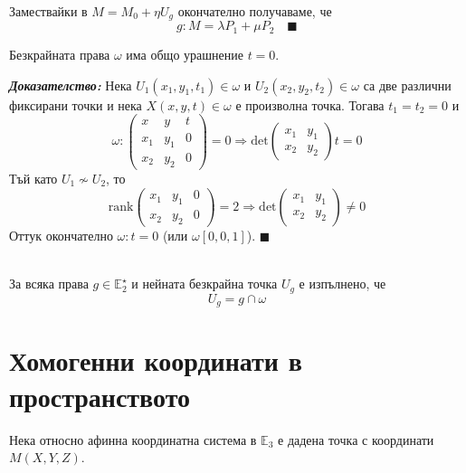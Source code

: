 \documentclass[12pt]{article}
\begin{document}
{Замествайки в $M=M_0+\eta U_g$ окончателно получаваме, че $$g:M=\lambda P_1+\mu P_2\quad \blacksquare$$
\begin{tcolorbox}[
    colback=blue!5,    %
    colframe=blue!75!black, %
    title={\textbf{Твърдение 3:}}, %
    fonttitle=\bfseries,
    boxrule=0.8pt,
    arc=1mm,           %
    top=2mm, bottom=2mm, left=3mm, right=3mm
]  Безкрайната права $\omega$ има общо урашнение $t=0$.
\end{tcolorbox}
\textit{\textbf{Доказателство:}} Нека $U_1(x_1,y_1,t_1)\in\omega$ и $U_2(x_2,y_2,t_2)\in\omega$ са две различни фиксирани точки и нека $X(x,y,t)\in\omega$ е произволна точка. Тогава $t_1=t_2=0$ и $$\omega:\begin{pmatrix}x & y & t \\ x_1 & y_1 & 0 \\ x_2 & y_2 & 0 \end{pmatrix}=0\Rightarrow \mathrm{det}\begin{pmatrix}x_1 & y_1 \\ x_2 & y_2\end{pmatrix}t=0$$
Тъй като $U_1\not\sim U_2$, то $$\mathrm{rank}\begin{pmatrix}x_1 & y_1 & 0 \\ x_2 & y_2 & 0\end{pmatrix}=2\Rightarrow\mathrm{det}\begin{pmatrix}x_1 & y_1 \\ x_2 & y_2\end{pmatrix}\neq 0$$ Оттук окончателно $\omega:t=0$ (или $\omega[0,0,1]$). $\blacksquare$
\\
\\
\begin{tcolorbox}[
    colback=blue!5,    %
    colframe=blue!75!black, %
    title={\textbf{Твърдение 4:}}, %
    fonttitle=\bfseries,
    boxrule=0.8pt,
    arc=1mm,           %
    top=2mm, bottom=2mm, left=3mm, right=3mm
]  За всяка права $g\in\mathbb{E}_2^\star$ и нейната безкрайна точка $U_g$ е изпълнено, че $$U_g=g\cap \omega$$
\end{tcolorbox}
\Large{\section{ Хомогенни координати в пространството}}
\Large{Нека относно афинна координатна система в $\mathbb{E}_3$ е дадена точка с координати $M(X,Y,Z)$.
\\
}}
\end{document}
